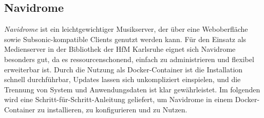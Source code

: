 \documentclass[12pt,a4paper]{report}
\begin{document}

  \subsection{Navidrome}
  \emph{Navidrome} ist ein leichtgewichtiger Musikserver, der über eine Weboberfläche sowie Subsonic-kompatible Clients genutzt werden kann. 
  Für den Einsatz als Medienserver in der Bibliothek der HfM Karlsruhe eignet sich Navidrome besonders gut, 
  da es ressourcenschonend, einfach zu administrieren und flexibel erweiterbar ist. 
  Durch die Nutzung als Docker-Container ist die Installation schnell durchführbar, Updates lassen sich unkompliziert einspielen, 
  und die Trennung von System und Anwendungsdaten ist klar gewährleistet.
  Im folgenden wird eine Schritt-für-Schritt-Anleitung geliefert, um Navidrome in einem Docker-Container zu installieren, zu konfigurieren und zu Nutzen.
\end{document}
